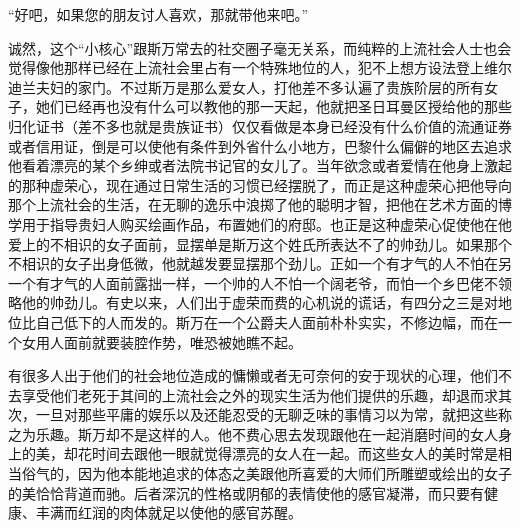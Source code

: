 \par “好吧，如果您的朋友讨人喜欢，那就带他来吧。”
\par 诚然，这个“小核心”跟斯万常去的社交圈子毫无关系，而纯粹的上流社会人士也会觉得像他那样已经在上流社会里占有一个特殊地位的人，犯不上想方设法登上维尔迪兰夫妇的家门。不过斯万是那么爱女人，打他差不多认遍了贵族阶层的所有女子，她们已经再也没有什么可以教他的那一天起，他就把圣日耳曼区授给他的那些归化证书（差不多也就是贵族证书）仅仅看做是本身已经没有什么价值的流通证券或者信用证，倒是可以使他有条件到外省什么小地方，巴黎什么偏僻的地区去追求他看着漂亮的某个乡绅或者法院书记官的女儿了。当年欲念或者爱情在他身上激起的那种虚荣心，现在通过日常生活的习惯已经摆脱了，而正是这种虚荣心把他导向那个上流社会的生活，在无聊的逸乐中浪掷了他的聪明才智，把他在艺术方面的博学用于指导贵妇人购买绘画作品，布置她们的府邸。也正是这种虚荣心促使他在他爱上的不相识的女子面前，显摆单是斯万这个姓氏所表达不了的帅劲儿。如果那个不相识的女子出身低微，他就越发要显摆那个劲儿。正如一个有才气的人不怕在另一个有才气的人面前露拙一样，一个帅的人不怕一个阔老爷，而怕一个乡巴佬不领略他的帅劲儿。有史以来，人们出于虚荣而费的心机说的谎话，有四分之三是对地位比自己低下的人而发的。斯万在一个公爵夫人面前朴朴实实，不修边幅，而在一个女用人面前就要装腔作势，唯恐被她瞧不起。
\par 有很多人出于他们的社会地位造成的慵懒或者无可奈何的安于现状的心理，他们不去享受他们老死于其间的上流社会之外的现实生活为他们提供的乐趣，却退而求其次，一旦对那些平庸的娱乐以及还能忍受的无聊乏味的事情习以为常，就把这些称之为乐趣。斯万却不是这样的人。他不费心思去发现跟他在一起消磨时间的女人身上的美，却花时间去跟他一眼就觉得漂亮的女人在一起。而这些女人的美时常是相当俗气的，因为他本能地追求的体态之美跟他所喜爱的大师们所雕塑或绘出的女子的美恰恰背道而驰。后者深沉的性格或阴郁的表情使他的感官凝滞，而只要有健康、丰满而红润的肉体就足以使他的感官苏醒。
